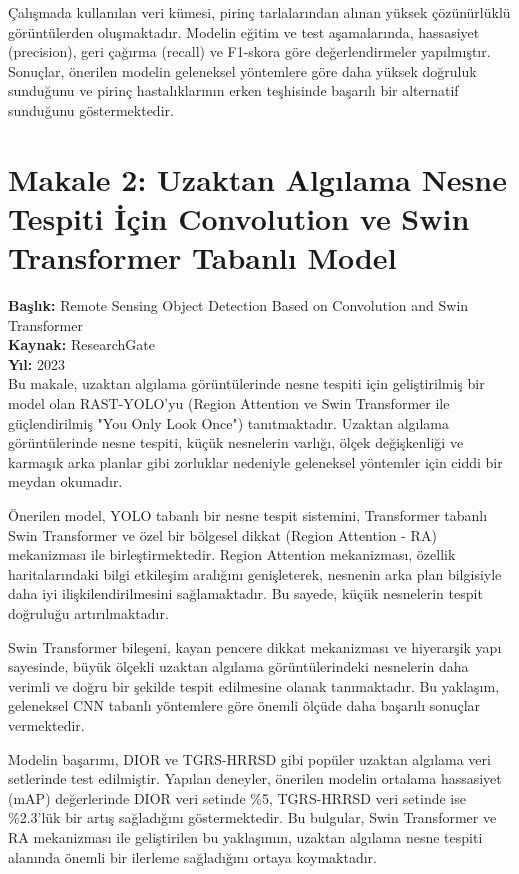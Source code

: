 \documentclass[a4paper,12pt]{article}
\begin{document}
Çalışmada kullanılan veri kümesi, pirinç tarlalarından alınan yüksek çözünürlüklü görüntülerden oluşmaktadır. Modelin eğitim ve test aşamalarında, hassasiyet (precision), geri çağırma (recall) ve F1-skora göre değerlendirmeler yapılmıştır. Sonuçlar, önerilen modelin geleneksel yöntemlere göre daha yüksek doğruluk sunduğunu ve pirinç hastalıklarının erken teşhisinde başarılı bir alternatif sunduğunu göstermektedir.

\section{Makale 2: Uzaktan Algılama Nesne Tespiti İçin Convolution ve Swin Transformer Tabanlı Model}
\textbf{Başlık:} Remote Sensing Object Detection Based on Convolution and Swin Transformer\\
\textbf{Kaynak:} ResearchGate\\
\textbf{Yıl:} 2023\\

Bu makale, uzaktan algılama görüntülerinde nesne tespiti için geliştirilmiş bir model olan RAST-YOLO'yu (Region Attention ve Swin Transformer ile güçlendirilmiş "You Only Look Once") tanıtmaktadır. Uzaktan algılama görüntülerinde nesne tespiti, küçük nesnelerin varlığı, ölçek değişkenliği ve karmaşık arka planlar gibi zorluklar nedeniyle geleneksel yöntemler için ciddi bir meydan okumadır.

Önerilen model, YOLO tabanlı bir nesne tespit sistemini, Transformer tabanlı Swin Transformer ve özel bir bölgesel dikkat (Region Attention - RA) mekanizması ile birleştirmektedir. Region Attention mekanizması, özellik haritalarındaki bilgi etkileşim aralığını genişleterek, nesnenin arka plan bilgisiyle daha iyi ilişkilendirilmesini sağlamaktadır. Bu sayede, küçük nesnelerin tespit doğruluğu artırılmaktadır.

Swin Transformer bileşeni, kayan pencere dikkat mekanizması ve hiyerarşik yapı sayesinde, büyük ölçekli uzaktan algılama görüntülerindeki nesnelerin daha verimli ve doğru bir şekilde tespit edilmesine olanak tanımaktadır. Bu yaklaşım, geleneksel CNN tabanlı yöntemlere göre önemli ölçüde daha başarılı sonuçlar vermektedir.

Modelin başarımı, DIOR ve TGRS-HRRSD gibi popüler uzaktan algılama veri setlerinde test edilmiştir. Yapılan deneyler, önerilen modelin ortalama hassasiyet (mAP) değerlerinde DIOR veri setinde \%5, TGRS-HRRSD veri setinde ise \%2.3'lük bir artış sağladığını göstermektedir. Bu bulgular, Swin Transformer ve RA mekanizması ile geliştirilen bu yaklaşımın, uzaktan algılama nesne tespiti alanında önemli bir ilerleme sağladığını ortaya koymaktadır.
\end{document}
